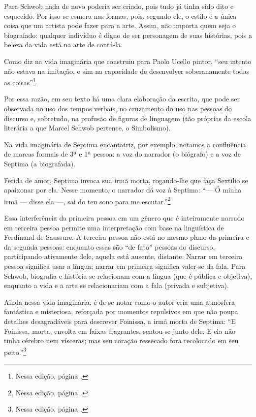 Para Schwob nada de novo poderia ser criado, pois tudo já tinha sido
dito e esquecido. Por isso se esmera nas formas, pois, segundo ele, o
estilo é a única coisa que um artista pode fazer para a arte. Assim, não
importa quem seja o biografado: qualquer indivíduo é digno de ser
personagem de suas histórias, pois a beleza da vida está na arte de
contá-la.

Como diz na vida imaginária que construiu para Paolo Ucello pintor,
``seu intento não estava na imitação, e sim na capacidade de desenvolver
soberanamente todas as coisas''\footnote{Nessa edição, página \pageref{intento}.}

Por essa razão, em seu texto há uma clara elaboração da escrita, que
pode ser observada no uso dos tempos verbais, no cruzamento do uso nas
pessoas do discurso e, sobretudo, na profusão de figuras de linguagem
(tão próprias da escola literária a que Marcel Schwob pertence, o
Simbolismo).

Na vida imaginária de Septima encantatriz, por exemplo, notamos a
confluência de marcas formais de 3ª e 1ª pessoa: a voz do narrador (o
biógrafo) e a voz de Septima (a biografada).

Ferida de amor, Septima invoca sua irmã morta, rogando-lhe que faça
Sextílio se apaixonar por ela. Nesse momento, o narrador dá voz à
Septima: ``--- Ó minha irmã --- disse ela ---, sai do teu sono para me escutar.''\footnote{Nessa edição, página \pageref{irma}.}

Essa interferência da primeira pessoa em um gênero que é inteiramente
narrado em terceira pessoa permite uma interpretação com base na
linguística de Ferdinand de Saussure. A terceira pessoa não está no
mesmo plano da primeira e da segunda pessoas: enquanto essas são ``de
fato'' pessoas do discurso, participando ativamente dele, aquela está
ausente, distante. Narrar em terceira pessoa significa usar a língua;
narrar em primeira significa valer-se da fala. Para Schwob, biografia e
história se relacionam com a língua (que é pública e objetiva), enquanto
a vida e a arte se relacionariam com a fala (privada e subjetiva).

Ainda nessa vida imaginária, é de se notar como o autor cria uma
atmosfera fantástica e misteriosa, reforçada por momentos repulsivos em
que não poupa detalhes desagradáveis para descrever Foinissa, a irmã
morta de Septima: ``E Foinissa, morta, envolta em faixas fragrantes, sentou-se junto dele.
E ela não tinha cérebro nem vísceras; mas seu coração ressecado fora
recolocado em seu peito.''\footnote{Nessa edição, página \pageref{viscera}.}


